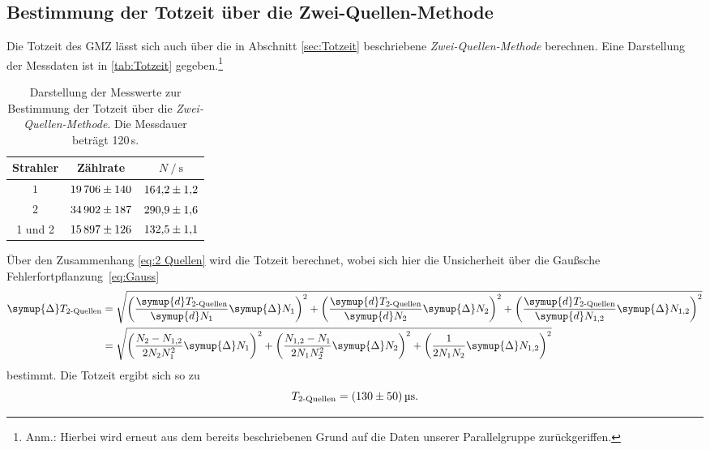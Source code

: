 \subsection{Bestimmung der Totzeit über die Zwei-Quellen-Methode}
Die Totzeit des GMZ lässt sich auch über die in Abschnitt \ref{sec:Totzeit} beschriebene \textit{Zwei-Quellen-Methode} berechnen. Eine Darstellung
der Messdaten ist in \autoref{tab:Totzeit} gegeben.\footnote{Anm.: Hierbei wird erneut aus dem bereits beschriebenen Grund auf die Daten 
unserer Parallelgruppe zurückgeriffen.}
\begin{table}[H]
    \centering
    \caption{Darstellung der Messwerte zur Bestimmung der Totzeit über die \textit{Zwei-Quellen-Methode}. Die Messdauer beträgt 120\,s.}
    \label{tab:Totzeit}
    \begin{tabular}{c S S}
      \toprule
      {Strahler} & {Zählrate} & {$N \mathbin{/} {\unit{\second}}$}\\
      \midrule
      $1$   & $\num{19706+-140}$ & $\num{164.2+-1.2}$ \\
      $2$   & $\num{34902+-187}$ & $\num{290.9+-1.6}$ \\
      {1 und 2} & $\num{15897+-126}$ & $\num{132.5+-1.1}$ \\
      \bottomrule
    \end{tabular}
  \end{table}
Über den Zusammenhang \eqref{eq:2 Quellen} wird die Totzeit berechnet, wobei sich hier die Unsicherheit über die Gaußsche 
Fehlerfortpflanzung~\eqref{eq:Gauss}
\begin{align*}
    \symup{\Delta}T_{\text{2-Quellen}} 
    &= \sqrt{\left(\frac{\symup{d}T_{\text{2-Quellen}}}{\symup{d}N_1}\symup{\Delta} N_1 \right)^2 
    + \left(\frac{\symup{d}T_{\text{2-Quellen}}}{\symup{d}N_2}\symup{\Delta} N_2 \right)^2
    + \left(\frac{\symup{d}T_{\text{2-Quellen}}}{\symup{d}N_{1,2}}\symup{\Delta} N_{1,2} \right)^2} \\
    &= \sqrt{\left(\frac{N_2 - N_{1,2}}{2N_2 N_1^2} \symup{\Delta}N_1 \right)^2 
    + \left(\frac{N_{1,2} - N_{1}}{2N_1 N_2^2} \symup{\Delta}N_2 \right)^2
    + \left( \frac{1}{2N_1 N_2}\symup{\Delta}N_{1,2}\right)^2}
\end{align*}
bestimmt.
Die Totzeit ergibt sich so zu
\begin{equation*}
    T_{\text{2-Quellen}} = \qty{130+-50}{\micro\second}.
\end{equation*}

